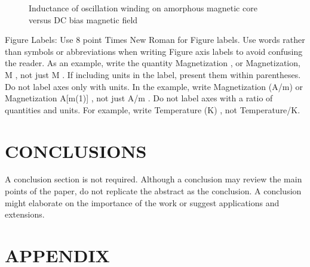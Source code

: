 \documentclass[a4paper, 10pt, conference]{ieeeconf}
\begin{document}
\begin{figure}[thpb]
\centering
{}
\caption{Inductance of oscillation winding on amorphous
magnetic core versus DC bias magnetic field}
\label{figurelabel}
\end{figure}


Figure Labels: Use 8 point Times New Roman for Figure labels. Use words rather than symbols or abbreviations when writing Figure axis labels to avoid confusing the reader. As an example, write the quantity Magnetization , or Magnetization, M , not just M . If including units in the label, present them within parentheses. Do not label axes only with units. In the example, write Magnetization (A/m) or Magnetization {A[m(1)]} , not just A/m . Do not label axes with a ratio of quantities and units. For example, write Temperature (K) , not Temperature/K. 

\section{CONCLUSIONS}

A conclusion section is not required. Although a conclusion may review the main points of the paper, do not replicate the abstract as the conclusion. A conclusion might elaborate on the importance of the work or suggest applications and extensions. 

\addtolength{\textheight}{-12cm} %







\section*{APPENDIX}
\end{document}
